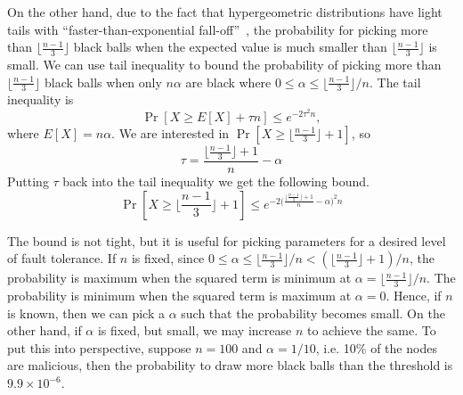 On the other hand, due to the fact that hypergeometric distributions have light tails with ``faster-than-exponential fall-off''~\cite{skala2013hypergeometric},
the probability for picking more than $\lfloor \frac{n-1}{3} \rfloor$ black balls when 
the expected value is much smaller than $\lfloor \frac{n-1}{3} \rfloor$ is small.
We can use tail inequality to bound the probability of picking more than $\lfloor \frac{n-1}{3} \rfloor$ black balls when only $n\alpha$ are black where $0 \le \alpha \le \lfloor \frac{n-1}{3} \rfloor / n$.
The tail inequality is
$$
\Pr[X \ge E[X] + \tau n] \le e^{-2\tau^2n},
$$
where $E[X] = n\alpha$.
We are interested in $\Pr[X \ge \lfloor \frac{n-1}{3} \rfloor + 1]$, so
$$
\tau = \frac{\lfloor \frac{n-1}{3} \rfloor + 1}{n} - \alpha
$$
Putting $\tau$ back into the tail inequality we get the following bound.
$$
\Pr[X \ge \lfloor \frac{n-1}{3} \rfloor + 1] \le e^{-2 \big(\frac{\lfloor  \frac{n - 1}{3} \rfloor + 1}{n} - \alpha \big)^2 n}
$$

The bound is not tight, but it is useful for picking parameters for a desired level of fault tolerance.
If $n$ is fixed, since $0 \le \alpha \le \lfloor \frac{n-1}{3} \rfloor/n < (\lfloor  \frac{n - 1}{3} \rfloor + 1) / n$,
the probability is maximum when the squared term is minimum at $\alpha = \lfloor \frac{n-1}{3} \rfloor/n$.
The probability is minimum when the squared term is maximum at $\alpha = 0$.
Hence, if $n$ is known, then we can pick a $\alpha$ such that the probability becomes small.
On the other hand, if $\alpha$ is fixed, but small, we may increase $n$ to achieve the same.
To put this into perspective,
suppose $n = 100$ and $\alpha = 1/10$, i.e. 10\% of the nodes are malicious,
then the probability to draw more black balls than the threshold is $9.9 \times 10^{-6}$.
